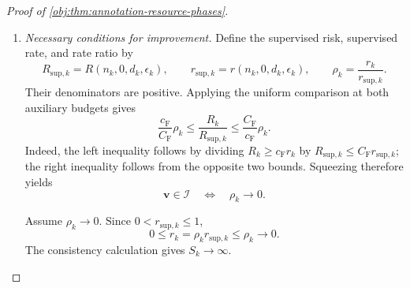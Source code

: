 \begin{proof}[Proof of \cref{obj:thm:annotation-resource-phases}]
\begin{enumerate}
First suppose that, for some real constant \(M_{\mathrm{or}}\),
\[
\frac{R_k}{b_k}\le M_{\mathrm{or}}
\]
eventually. Define
\[
K_{\mathrm{or}}=\frac{\max\{M_{\mathrm{or}},1\}}{c_{\mathrm F}}>0.
\]
The lower comparison then gives, eventually,
\[
c_{\mathrm F}r_k\le R_k
\le \frac{\max\{M_{\mathrm{or}},1\}}{S_k},
\qquad
r_k\le\frac{K_{\mathrm{or}}}{S_k}.
\]
Eventually \(S_k>K_{\mathrm{or}}\), so \(r_k<1\) and its cap is inactive. Thus
\[
1+S_kz_k^2=S_kr_k\le K_{\mathrm{or}},
\qquad
(z_k\sqrt{S_k})^2\le K_{\mathrm{or}}.
\]
All factors are nonnegative, and therefore
\[
z_k\sqrt{S_k}\le\sqrt{K_{\mathrm{or}}},
\qquad
d_k\le
\sqrt{K_{\mathrm{or}}}\,
\frac{N_k\epsilon_k\ell_k}{\sqrt{S_k}}
\]
eventually. This is the required big-\(O\) condition.

Conversely, that big-\(O\) condition supplies a constant \(K_{\mathrm{dim}}>0\) such that eventually
\[
d_k\le K_{\mathrm{dim}}
\frac{N_k\epsilon_k\ell_k}{\sqrt{S_k}}.
\]
Multiplication by the positive factor
\(\sqrt{S_k}/(N_k\epsilon_k\ell_k)\) gives
\[
z_k\sqrt{S_k}\le K_{\mathrm{dim}},
\qquad
S_kz_k^2\le K_{\mathrm{dim}}^2.
\]
Consequently,
\[
r_k\le S_k^{-1}+z_k^2
\le\frac{1+K_{\mathrm{dim}}^2}{S_k},
\qquad
\frac{R_k}{b_k}
\le C_{\mathrm F}(1+K_{\mathrm{dim}}^2)
\]
eventually. This proves the oracle equivalence.

\item \emph{Necessary conditions for improvement.}
Define the supervised risk, supervised rate, and rate ratio by
\[
R_{\mathrm{sup},k}=R(n_k,0,d_k,\epsilon_k),\qquad
r_{\mathrm{sup},k}=r(n_k,0,d_k,\epsilon_k),\qquad
\rho_k=\frac{r_k}{r_{\mathrm{sup},k}}.
\]
Their denominators are positive. Applying the uniform comparison at both auxiliary budgets gives
\[
\frac{c_{\mathrm F}}{C_{\mathrm F}}\rho_k
\le \frac{R_k}{R_{\mathrm{sup},k}}
\le \frac{C_{\mathrm F}}{c_{\mathrm F}}\rho_k.
\]
Indeed, the left inequality follows by dividing
\(R_k\ge c_{\mathrm F}r_k\) by
\(R_{\mathrm{sup},k}\le C_{\mathrm F}r_{\mathrm{sup},k}\);
the right inequality follows from the opposite two bounds. Squeezing therefore yields
\[
\mathbf v\in\mathcal I
\quad\Longleftrightarrow\quad
\rho_k\longrightarrow0.
\]

Assume \(\rho_k\to0\). Since \(0<r_{\mathrm{sup},k}\le1\),
\[
0\le r_k=\rho_kr_{\mathrm{sup},k}\le\rho_k\longrightarrow0.
\]
The consistency calculation gives \(S_k\to\infty\).


\end{enumerate}
\end{proof}
